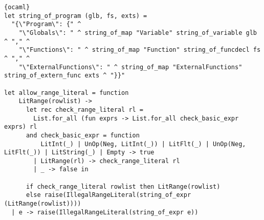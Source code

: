 \begin{lstlisting}{ocaml}
let string_of_program (glb, fs, exts) =
  "{\"Program\": {" ^
    "\"Globals\": " ^ string_of_map "Variable" string_of_variable glb ^ "," ^
    "\"Functions\": " ^ string_of_map "Function" string_of_funcdecl fs ^ "," ^
    "\"ExternalFunctions\": " ^ string_of_map "ExternalFunctions" string_of_extern_func exts ^ "}}"

let allow_range_literal = function
    LitRange(rowlist) ->
      let rec check_range_literal rl =
        List.for_all (fun exprs -> List.for_all check_basic_expr exprs) rl
      and check_basic_expr = function
          LitInt(_) | UnOp(Neg, LitInt(_)) | LitFlt(_) | UnOp(Neg, LitFlt(_)) | LitString(_) | Empty -> true
        | LitRange(rl) -> check_range_literal rl
        | _ -> false in

      if check_range_literal rowlist then LitRange(rowlist)
      else raise(IllegalRangeLiteral(string_of_expr (LitRange(rowlist))))
  | e -> raise(IllegalRangeLiteral(string_of_expr e))
\end{lstlisting}
